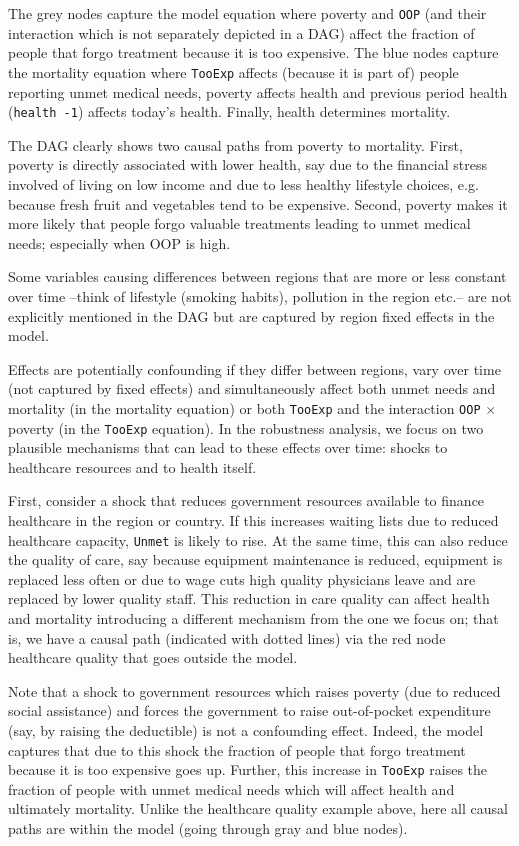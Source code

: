 \documentclass[a4paper,12pt]{article}
\begin{document}
The grey nodes capture the model equation where poverty and \texttt{OOP} (and their interaction which is not separately depicted in a DAG) affect the fraction of people that forgo treatment because it is too expensive. The blue nodes capture the mortality equation where \texttt{TooExp} affects (because it is part of) people reporting unmet medical needs, poverty affects health and previous period health (\texttt{health -1}) affects today's health. Finally, health determines mortality.

The DAG clearly shows two causal paths from poverty to mortality. First, poverty is directly associated with lower health, say due to the financial stress involved of living on low income and due to less healthy lifestyle choices, e.g. because fresh fruit and vegetables tend to be expensive. Second, poverty makes it more likely that people forgo valuable treatments leading to unmet medical needs; especially when OOP is high. 

Some variables causing differences between regions that are more or less constant over time --think of lifestyle (smoking habits), pollution in the region etc.-- are not explicitly mentioned in the DAG but are captured by region fixed effects in the model.

Effects are potentially confounding if they differ between regions, vary over time (not captured by fixed effects) and simultaneously affect both unmet needs and mortality (in the mortality equation) or both \texttt{TooExp} and the interaction \texttt{OOP} \(\times\) poverty (in the \texttt{TooExp} equation). In the robustness analysis, we focus on two plausible mechanisms that can lead to these effects over time: shocks to healthcare resources and to health itself.

First, consider a shock that reduces government resources available to finance healthcare in the region or country. If this increases waiting lists due to reduced healthcare capacity, \texttt{Unmet} is likely to rise. At the same time, this can also reduce the quality of care, say because equipment maintenance is reduced, equipment is replaced less often or due to wage cuts high quality physicians leave and are replaced by lower quality staff. This reduction in care quality can affect health and mortality introducing a different mechanism from the one we focus on; that is, we have a causal path (indicated with dotted lines) via the red node healthcare quality that goes outside the model.

Note that a shock to government resources which raises poverty (due to reduced social assistance) and forces the government to raise out-of-pocket expenditure (say, by raising the deductible) is not a confounding effect. Indeed, the model captures that due to this shock the fraction of people that forgo treatment because it is too expensive goes up. Further, this increase in \texttt{TooExp} raises the fraction of people with unmet medical needs which will affect health and ultimately mortality. Unlike the healthcare quality example above, here all causal paths are within the model (going through gray and blue nodes).
\end{document}
